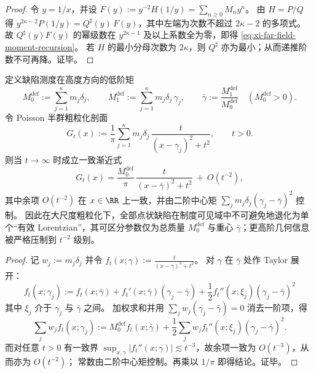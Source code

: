\begin{proof}
令 \(y=1/x\)，并设
\(
F(y):=y^{-2}H(1/y)=\sum_{n\ge 0}M_ny^n
\)。
由 \(H=P/Q\) 得
\(
y^{2\kappa-2}P(1/y)=Q^\sharp(y)\,F(y)
\)，其中左端为次数不超过 \(2\kappa-2\) 的多项式。
故 \(Q^\sharp(y)F(y)\) 的幂级数在 \(y^{2\kappa-1}\) 及以上系数全为零，即得 \eqref{eq:xi-far-field-moment-recursion}。
若 \(H\) 的最小分母次数为 \(2\kappa\)，则 \(Q^\sharp\) 亦为最小；从而递推阶数不可再降。证毕。
\end{proof}

\begin{proposition}\label{prop:xi-poisson-coarsegraining-nohair}
定义缺陷测度在高度方向的低阶矩
\[
M_0^{\mathrm{def}}:=\sum_{j=1}^{\kappa}m_j\delta_j,\qquad
M_1^{\mathrm{def}}:=\sum_{j=1}^{\kappa}m_j\delta_j\,\gamma_j,\qquad
\bar\gamma:=\frac{M_1^{\mathrm{def}}}{M_0^{\mathrm{def}}}\quad(M_0^{\mathrm{def}}>0).
\]
令 Poisson 半群粗粒化剖面
\[
G_t(x)
:=\frac{1}{\pi}\sum_{j=1}^{\kappa}m_j\delta_j\,\frac{t}{(x-\gamma_j)^2+t^2},
\qquad t>0.
\]
则当 \(t\to\infty\) 时成立一致渐近式
\[
\boxed{\;
G_t(x)
=\frac{M_0^{\mathrm{def}}}{\pi}\,\frac{t}{(x-\bar\gamma)^2+t^2}
\ +\ O(t^{-2}),\;}
\]
其中余项 \(O(t^{-2})\) 在 \(x\in\RR\) 上一致，并由二阶中心矩
\(\sum_j m_j\delta_j(\gamma_j-\bar\gamma)^2\)
控制。
因此在大尺度粗粒化下，全部点状缺陷在制度可见域中不可避免地退化为单个“有效 Lorentzian”，其可区分参数仅为总质量 \(M_0^{\mathrm{def}}\) 与重心 \(\bar\gamma\)；更高阶几何信息被严格压制到 \(t^{-2}\) 级别。
\end{proposition}

\begin{proof}
记 \(w_j:=m_j\delta_j\) 并令 \(f_t(x;\gamma):=\frac{t}{(x-\gamma)^2+t^2}\)。
对 \(\gamma\) 在 \(\bar\gamma\) 处作 Taylor 展开：
\[
f_t(x;\gamma_j)
:=f_t(x;\bar\gamma)
+f_t'(x;\bar\gamma)(\gamma_j-\bar\gamma)
+\frac12 f_t''(x;\xi_j)(\gamma_j-\bar\gamma)^2
\]
其中 \(\xi_j\) 介于 \(\gamma_j\) 与 \(\bar\gamma\) 之间。
加权求和并用 \(\sum_j w_j(\gamma_j-\bar\gamma)=0\) 消去一阶项，得
\[
\sum_j w_j f_t(x;\gamma_j)
:=M_0^{\mathrm{def}} f_t(x;\bar\gamma)
+\frac12\sum_j w_j f_t''(x;\xi_j)(\gamma_j-\bar\gamma)^2.
\]
而对任意 \(t>0\) 有一致界 \(\sup_{x,\gamma}|f_t''(x;\gamma)|\lesssim t^{-3}\)，故余项一致为 \(O(t^{-3})\)，从而亦为 \(O(t^{-2})\)；
常数由二阶中心矩控制。再乘以 \(1/\pi\) 即得结论。证毕。
\end{proof}

